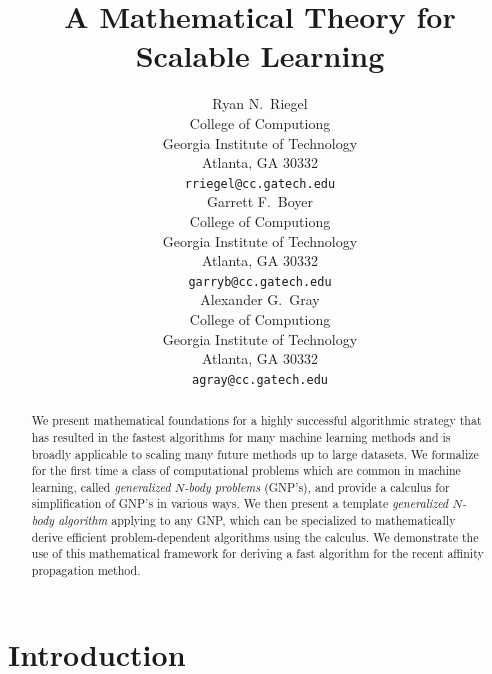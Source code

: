 \documentclass{article}
\title{A Mathematical Theory for Scalable Learning}
\author{
Ryan N.~Riegel \\
College of Computiong \\
Georgia Institute of Technology \\
Atlanta, GA 30332 \\
\texttt{rriegel@cc.gatech.edu} \\
\And
Garrett F.~Boyer \\
College of Computiong \\
Georgia Institute of Technology \\
Atlanta, GA 30332 \\
\texttt{garryb@cc.gatech.edu} \\
\And
Alexander G.~Gray \\
College of Computiong \\
Georgia Institute of Technology \\
Atlanta, GA 30332 \\
\texttt{agray@cc.gatech.edu} \\
}
\begin{document}
\makeanontitle

\begin{abstract}
We present mathematical foundations for a highly successful
algorithmic strategy that has resulted in the fastest algorithms for
many machine learning methods and is broadly applicable to scaling
many future methods up to large datasets.  We formalize for the first
time a class of computational problems which are common in machine
learning, called {\em generalized $N$-body problems} (GNP's), and
provide a calculus for simplification of GNP's in various ways.  We
then present a template {\em generalized $N$-body algorithm} applying
to any GNP, which can be specialized to mathematically derive
efficient problem-dependent algorithms using the calculus.  We
demonstrate the use of this mathematical framework for deriving a fast
algorithm for the recent affinity propagation method.
\end{abstract}

\section{Introduction}
\end{document}
